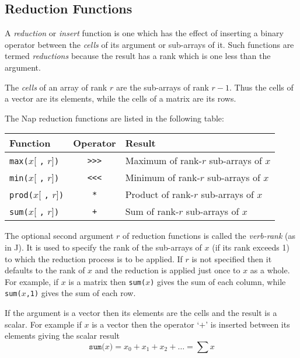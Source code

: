\subsection{Reduction Functions}
\label{function-Reduction}

A \textit{reduction} or \textit{insert} function is one which has the effect of inserting a
binary operator between the \textit{cells} of its argument or
sub-arrays of it.
Such functions are termed \textit{reductions} because the result has a rank which is one less
than the argument.

The \textit{cells} of an array of rank $r$ are the sub-arrays of rank $r-1$.
Thus the cells of a vector are its elements,
while the cells of a matrix are its rows.

The Nap reduction functions are listed in the following table:

\begin{tabular}{|l|c|l|}
\hline 
\textbf{Function} & \textbf{Operator} & \textbf{Result}
\\
\hline 
\hline 
\texttt{max(}$x$[ \texttt{,} $r$]\texttt{)} & \texttt{>>>} & Maximum of rank-$r$ sub-arrays of $x$
\\
\hline 
\texttt{min(}$x$[ \texttt{,} $r$]\texttt{)} & \texttt{<<<} & Minimum of rank-$r$ sub-arrays of $x$
\\
\hline 
\texttt{prod(}$x$[ \texttt{,} $r$]\texttt{)} & \texttt{*} & Product of rank-$r$ sub-arrays of $x$
\\
\hline 
\texttt{sum(}$x$[ \texttt{,} $r$]\texttt{)} & \texttt{+} & Sum of rank-$r$ sub-arrays of $x$
\\
\hline
\end{tabular}

The optional second argument $r$ of reduction functions is called the \textit{verb-rank} (as in J).
It is used to specify the rank of the sub-arrays of $x$ (if its rank exceeds 1)
to which the reduction process is to be applied.
If $r$ is not specified then it defaults to the rank of $x$ and the reduction is applied just
once to $x$ as a whole.
For example, if $x$ is a matrix then 
\texttt{sum(}$x$\texttt{)} gives the sum of each column, while
\texttt{sum(}$x$\texttt{,1)} gives the sum of each row.

If the argument is a vector then its elements are the cells and the result is a scalar.
For example if $x$ is a vector then the operator `$+$' is inserted between its elements giving
the scalar result
\[ \texttt{sum(}x\texttt{)} = x_0 + x_1 + x_2 + \ldots = \sum x \]

